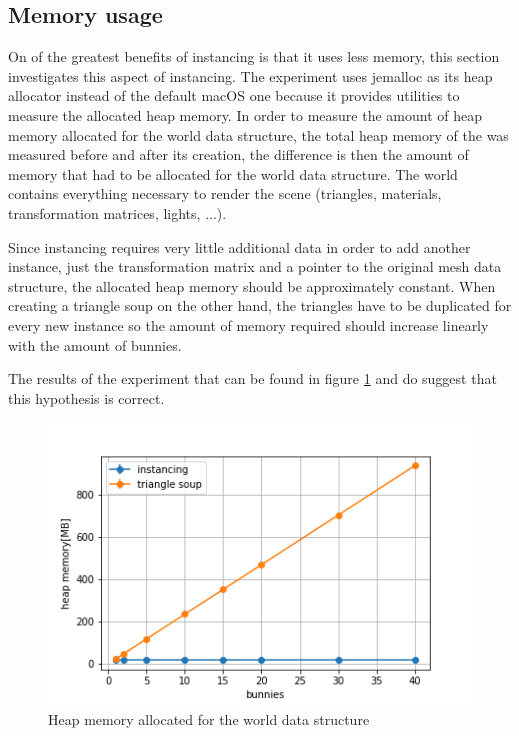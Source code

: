 \documentclass{article}
\begin{document}
\subsection{Memory usage}

On of the greatest benefits of instancing is that it uses less memory, this section investigates this aspect of instancing. The experiment uses jemalloc as its heap allocator instead of the default macOS one because it provides utilities to measure the allocated heap memory. In order to measure the amount of heap memory allocated for the world data structure, the total heap memory of the was measured before and after its creation, the difference is then the amount of memory that had to be allocated for the world data structure. The world contains everything necessary to render the scene (triangles, materials, transformation matrices, lights, ...).

Since instancing requires very little additional data in order to add another instance, just the transformation matrix and a pointer to the original mesh data structure, the allocated heap memory should be approximately constant. When creating a triangle soup on the other hand, the triangles have to be duplicated for every new instance so the amount of memory required should increase linearly with the amount of bunnies.

The results of the experiment that can be found in figure \ref{fig:instancing_heap_memory} and do suggest that this hypothesis is correct.

\begin{figure}[!htb]
    \centering
    \includegraphics[width=12cm]{plots/instancing_heap_memory.png}
    \caption{Heap memory allocated for the world data structure}
    \label{fig:instancing_heap_memory}
\end{figure}
\end{document}
